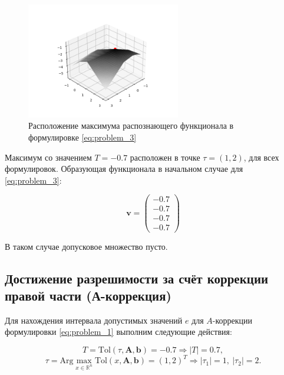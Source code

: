 \documentclass{article}
\begin{document}
  \begin{figure}[htbp!]
		\begin{center}
			\includegraphics[width = 0.6\textwidth]{tol_3}
			\caption{Расположение максимума распознающего функционала в
        формулировке \ref{eq:problem_3}}
      \label{figure:tol_1}
		\end{center}
	\end{figure}

  Максимум со значением \( T = -0.7 \) расположен в точке
  \( \tau = (1, 2) \), для всех формулировок. Образующая функционала в
  начальном случае для \ref{eq:problem_3}:

  \begin{equation}
    \mathbf{v} = \begin{pmatrix}
      -0.7 \\
      -0.7 \\
      -0.7 \\
      -0.7
    \end{pmatrix}
  \end{equation}

  В таком случае допусковое множество пусто.

  \subsection{Достижение разрешимости за счёт коррекции правой части
  (А-коррекция)}

  Для нахождения интервала допустимых значений \( e \) для
  \( A \)-коррекции формулировки \ref{eq:problem_1} выполним следующие
  действия:

  \begin{equation*}
    T = \text{Tol}(\tau, \mathbf{A}, \mathbf{b}) = -0.7 \Rightarrow |T| = 0.7,
  \end{equation*}
  \begin{equation*}
    \tau = \text{Arg} \max_{x \in \mathbb{R}^n}
    \text{Tol}(x, \mathbf{A}, \mathbf{b}) = (1, 2)^T \Rightarrow
    |\tau_1| = 1, \ |\tau_2| = 2.
  \end{equation*}
\end{document}

